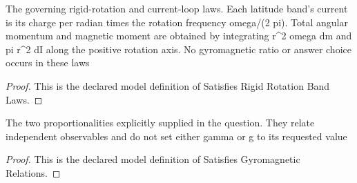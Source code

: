 \begin{definition}
  \label{def:physics:phyx-mini-0970:phyxminiproblems-problemphyxmini0970-satisfiesrigidrotationbandlaws}
  The governing rigid-rotation and current-loop laws. Each latitude band's current is its charge per radian times the rotation frequency omega/(2 pi). Total angular momentum and magnetic moment are obtained by integrating r\textasciicircum{}2 omega dm and pi r\textasciicircum{}2 dI along the positive rotation axis. No gyromagnetic ratio or answer choice occurs in these laws
\end{definition}
\begin{proof}
  This is the declared model definition of Satisfies Rigid Rotation Band Laws.
\end{proof}
\begin{definition}
  \label{def:physics:phyx-mini-0970:phyxminiproblems-problemphyxmini0970-satisfiesgyromagneticrelations}
  The two proportionalities explicitly supplied in the question. They relate independent observables and do not set either gamma or g to its requested value
\end{definition}
\begin{proof}
  This is the declared model definition of Satisfies Gyromagnetic Relations.
\end{proof}
